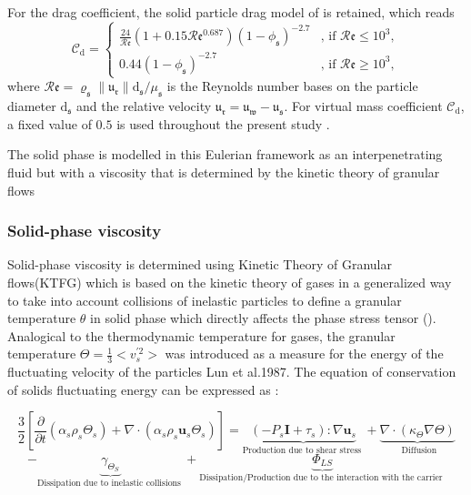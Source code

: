 \documentclass[review,3p,times,12pt]{elsarticle}
\begin{document}
%
For the drag coefficient, the solid particle drag model of \citet{wen1966generalized} is retained, which reads
\begin{equation}
\mathcal{C}_{\mathrm{d}}=
\begin{cases}
\frac{24}{\mathcal{R}\mathfrak{e}}\left(1+0.15\mathcal{R}\mathfrak{e}^{0.687}\right)\left(1-\phi_{\mathfrak{s}}\right)^{-2.7}&\text{, if } \mathcal{R}\mathfrak{e}\le 10^3,\\
0.44\left(1-\phi_{\mathfrak{s}}\right)^{-2.7} &\text{, if } \mathcal{R}\mathfrak{e}\ge 10^3,
\end{cases}
\end{equation}
where $\mathcal{R}\mathfrak{e}=\varrho_{\mathfrak{s}}\|\mathfrak{u}_{\mathfrak{r}}\|\mathrm{d}_{\mathfrak{s}}/\mu_{\mathfrak{s}}$ is the Reynolds number bases on the particle diameter $\mathrm{d}_{\mathfrak{s}}$ and the relative velocity $\boldsymbol{\mathfrak{u}}_{\mathfrak{r}}=\boldsymbol{\mathfrak{u}}_{\mathfrak{w}}-\boldsymbol{\mathfrak{u}}_{\mathfrak{s}}$. For virtual mass coefficient 
$\mathcal{C}_{\mathrm{d}}$, a fixed value of $0.5$ is used throughout the present study \cite{auton1988force}.


The solid phase is modelled in this Eulerian framework as an interpenetrating fluid but with a viscosity that is determined by the kinetic theory of granular flows 
\subsubsection{Solid-phase viscosity}
Solid-phase viscosity is determined using Kinetic Theory of Granular flows(KTFG) which is based on the kinetic theory of gases in a generalized way to take into account collisions of inelastic particles to define a granular temperature $\theta$ in solid phase which directly affects the phase stress tensor (\cite{Gonzalez-2017}). Analogical to the thermodynamic temperature for gases, the granular temperature $\Theta=\frac{1}{3}<v_{s}^{\prime 2}>$ was introduced as a measure for the energy of the fluctuating velocity of the particles {\color{red} Lun et al.1987.}
The equation of conservation of solids fluctuating energy can be expressed as \cite{Wang-2013}: 

\begin{equation}
\frac{3}{2}\left[\frac{\partial}{\partial t}\left(\alpha_{s} \rho_{s} \Theta_{s}\right)+\nabla \cdot\left(\alpha_{s} \rho_{s} \mathbf{u}_{s} \Theta_{s}\right)\right]= 
\underbrace{\left(-P_{s} \mathbf{I}+\tau_{s}\right): \nabla \mathbf{u}_{s}}_{\text {Production due to shear stress }}+\underbrace{\nabla \cdot\left(\kappa_{\Theta} \nabla \Theta\right)}_{\text { Diffusion}}
\end{equation}
$$
-\underbrace{\gamma_{\Theta_S}}_{\text {Dissipation due  to  inelastic collisions }}+\underbrace{\Phi_{LS}}_{\text {Dissipation/Production  due to the interaction with the carrier }}
$$
\end{document}
